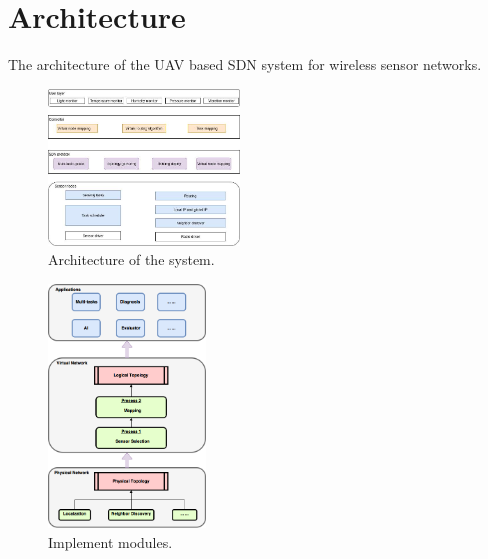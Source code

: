 \section{Architecture}

The architecture of the UAV based SDN system for wireless sensor networks.

\begin{figure}[htbp]
	\centering
	\includegraphics[width=2in]{./Figure/Architecture.jpeg}
	\caption{Architecture of the system.}
	\label{Architecture}
\end{figure}

\begin{figure}[htbp]
	\centering
	\includegraphics[width=1.65in]{./Figure/Design.png}
	\caption{Implement modules.}
	\label{Design}
\end{figure}